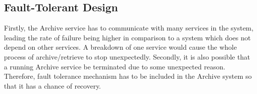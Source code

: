         \subsection{Fault-Tolerant Design}   
        Firstly, the Archive service has to communicate with many services in the system, leading the rate of failure being higher
        in comparison to a system which does not depend on other services. A breakdown 
        of one service would cause the whole process of archive/retrieve to stop unexpectedly. Secondly, it is also possible that a running Archive service be terminated
        due to some unexpected reason. Therefore, fault tolerance mechanism has to be included in the Archive system so that it has a chance of 
        recovery. 

